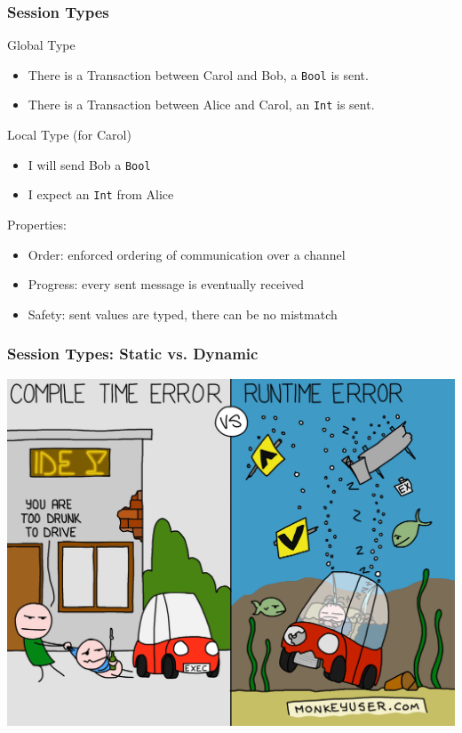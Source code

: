 \documentclass[12pt]{beamer}
\begin{document}
\begin{frame}[t]
\frametitle{Session Types}

Global Type

\begin{itemize}
    \item There is a Transaction between Carol and Bob, a \texttt{Bool} is sent.
    \item There is a Transaction between Alice and Carol, an \texttt{Int} is sent.
\end{itemize}

Local Type (for Carol)

\begin{itemize}
    \item I will send Bob a \texttt{Bool}
    \item I expect an \texttt{Int} from Alice
\end{itemize}

Properties: 
\begin{itemize}
    \item Order: enforced ordering of communication over a channel
    \item Progress: every sent message is eventually received
    \item Safety: sent values are typed, there can be no mistmatch
\end{itemize}
\end{frame}


\begin{frame}
\frametitle{Session Types: Static vs. Dynamic}

\begin{center}
\includegraphics[scale=0.120]{img/runtime-vs-compile-time-errors.png}
\end{center}
\end{frame}
\end{document}
